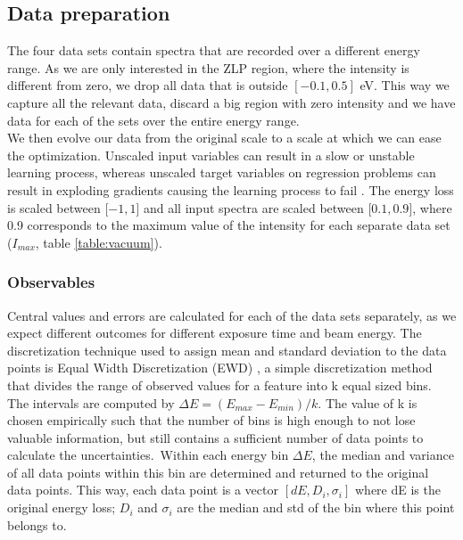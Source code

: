 \documentclass[11pt,a4paper]{article}
\numberwithin{equation}{section}
\numberwithin{figure}{section}
\numberwithin{table}{section}
\begin{document}
\subsection{Data preparation}
The four data sets contain spectra that are recorded over a different energy range. As we are only interested in the ZLP region, where the intensity is different from zero, we drop all data that is outside $[-0.1, 0.5]$ eV. This way we capture all the relevant data, discard a big region with zero intensity and we have data for each of the sets over the entire energy range. \\
We then evolve our data from the original scale to a scale at which we can ease the optimization. Unscaled input variables can result in a slow or unstable learning process, whereas unscaled target variables on regression problems can result in exploding gradients causing the learning process to fail \cite{juan}. The energy loss is scaled between [$-1,1$] and all input spectra are scaled between [$0.1, 0.9$], where 0.9 corresponds to the maximum value of the intensity for each separate data set ($I_{max}$, table \ref{table:vacuum}). 

\subsubsection*{Observables}
Central values and errors are calculated for each of the data sets separately, as we expect different outcomes for different exposure time and beam energy. The discretization technique used to assign mean and standard deviation to the data points is Equal Width Discretization (EWD) \cite{Dash:2011}, a simple discretization method that divides the range of observed values for a feature into k equal sized bins. The intervals are computed by 
$\Delta E = (E_{max} - E_{min}) / k$. The value of k is chosen empirically such that the number of bins is high enough to not lose valuable information, but still contains a sufficient number of data points to calculate the uncertainties.\
 Within each energy bin $\Delta E$, the median and variance of all data points within this bin are determined and returned to the original data points. This way, each data point is a vector $[dE, D_i, \sigma_i]$ where dE is the original energy loss; $D_i$ and $\sigma_i$ are the median and std of the bin where this point belongs to. 
\end{document}
